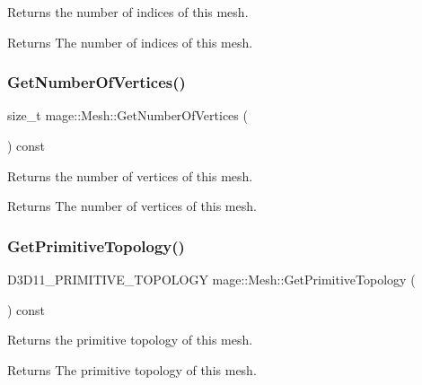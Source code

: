 Returns the number of indices of this mesh.

\begin{DoxyReturn}{Returns}
The number of indices of this mesh. 
\end{DoxyReturn}
\hypertarget{classmage_1_1_mesh_af2787f8893895e9a8ebec70d3062288f}{}\label{classmage_1_1_mesh_af2787f8893895e9a8ebec70d3062288f} 
\subsubsection{\texorpdfstring{Get\+Number\+Of\+Vertices()}{GetNumberOfVertices()}}
{\footnotesize\ttfamily size\+\_\+t mage\+::\+Mesh\+::\+Get\+Number\+Of\+Vertices (\begin{DoxyParamCaption}{ }\end{DoxyParamCaption}) const\hspace{0.3cm}{\ttfamily [noexcept]}}

Returns the number of vertices of this mesh.

\begin{DoxyReturn}{Returns}
The number of vertices of this mesh. 
\end{DoxyReturn}
\hypertarget{classmage_1_1_mesh_af64af13acf2f372515ffdc20ce45fcb4}{}\label{classmage_1_1_mesh_af64af13acf2f372515ffdc20ce45fcb4} 
\subsubsection{\texorpdfstring{Get\+Primitive\+Topology()}{GetPrimitiveTopology()}}
{\footnotesize\ttfamily D3\+D11\+\_\+\+P\+R\+I\+M\+I\+T\+I\+V\+E\+\_\+\+T\+O\+P\+O\+L\+O\+GY mage\+::\+Mesh\+::\+Get\+Primitive\+Topology (\begin{DoxyParamCaption}{ }\end{DoxyParamCaption}) const\hspace{0.3cm}{\ttfamily [noexcept]}}

Returns the primitive topology of this mesh.

\begin{DoxyReturn}{Returns}
The primitive topology of this mesh. 
\end{DoxyReturn}
\hypertarget{classmage_1_1_mesh_a01ea4c5a09ffc6b4babc26a4f85a673e}{}\label{classmage_1_1_mesh_a01ea4c5a09ffc6b4babc26a4f85a673e} 
